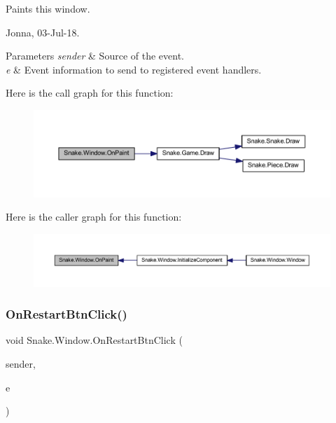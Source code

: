 Paints this window. 

Jonna, 03-\/\+Jul-\/18. 


\begin{DoxyParams}{Parameters}
{\em sender} & Source of the event. \\
\hline
{\em e} & Event information to send to registered event handlers. \\
\hline
\end{DoxyParams}
Here is the call graph for this function\+:
\nopagebreak
\begin{figure}[H]
\begin{center}
\leavevmode
\includegraphics[width=350pt]{d8/dae/class_snake_1_1_window_ae50a37d5b61d3704469c2902308d96e3_cgraph}
\end{center}
\end{figure}
Here is the caller graph for this function\+:
\nopagebreak
\begin{figure}[H]
\begin{center}
\leavevmode
\includegraphics[width=350pt]{d8/dae/class_snake_1_1_window_ae50a37d5b61d3704469c2902308d96e3_icgraph}
\end{center}
\end{figure}
\mbox{\label{class_snake_1_1_window_af9391fc232a8726ba50d284bb23271bb}} 
\subsubsection{\texorpdfstring{On\+Restart\+Btn\+Click()}{OnRestartBtnClick()}}
{\footnotesize\ttfamily void Snake.\+Window.\+On\+Restart\+Btn\+Click (\begin{DoxyParamCaption}\item[{object}]{sender,  }\item[{Event\+Args}]{e }\end{DoxyParamCaption})\hspace{0.3cm}{\ttfamily [private]}}



